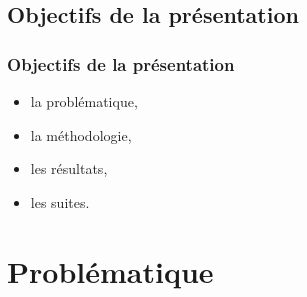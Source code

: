             \subsection{Objectifs de la présentation} 
		\begin{frame}[allowframebreaks]
			\frametitle{Objectifs de la présentation}
			\begin {itemize}
				
                                \item la problématique,
                                \item la méthodologie,
                                \item les résultats,
                                \item les suites.
                        \end{itemize}
		\end{frame}

               \section{Problématique} 
		

